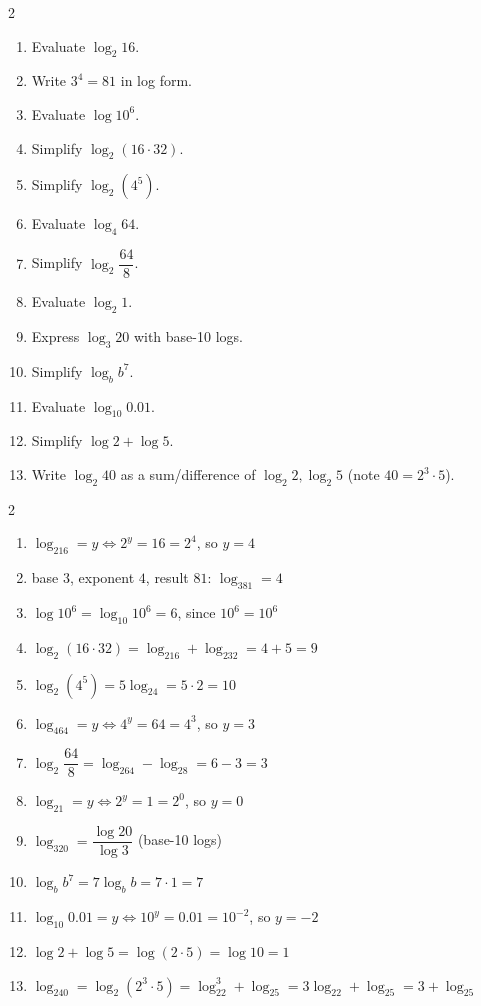 \documentclass[11pt]{article}
\begin{document}
\begin{recapbox}
\begin{multicols}{2}
\small
\begin{enumerate}[leftmargin=*,itemsep=3pt]
  \item Evaluate $\log_2 16$.
  \item Write $3^4=81$ in log form.
  \item Evaluate $\log 10^6$.
  \item Simplify $\log_2(16\cdot32)$.
  \item Simplify $\log_2(4^5)$.
  \item Evaluate $\log_4 64$.
  \item Simplify $\log_2\dfrac{64}{8}$.
  \item Evaluate $\log_2 1$.
  \item Express $\log_3 20$ with base-10 logs.
  \item Simplify $\log_b b^7$.
  \item Evaluate $\log_{10} 0.01$.
  \item Simplify $\log 2+\log 5$.
  \item Write $\log_2 40$ as a sum/difference of $\log_2 2,\log_2 5$ (note $40=2^3\cdot5$).
\end{enumerate}
\end{multicols}
\end{recapbox}

\begin{keybox}
\begin{multicols}{2}
\small
\begin{enumerate}[leftmargin=*,itemsep=3pt]
  \item $\log_216=y\iff2^y=16=2^4$, so $y=4$
  \item base $3$, exponent $4$, result $81$: $\log_381=4$
  \item $\log10^6=\log_{10}10^6=6$, since $10^6=10^6$
  \item $\log_2(16\cdot32)=\log_216+\log_232=4+5=9$
  \item $\log_2(4^5)=5\log_24=5\cdot2=10$
  \item $\log_464=y\iff4^y=64=4^3$, so $y=3$
  \item $\log_2\dfrac{64}{8}=\log_264-\log_28=6-3=3$
  \item $\log_21=y\iff2^y=1=2^0$, so $y=0$
  \item $\log_320=\dfrac{\log20}{\log3}$ (base-10 logs)
  \item $\log_bb^7=7\log_bb=7\cdot1=7$
  \item $\log_{10}0.01=y\iff10^y=0.01=10^{-2}$, so $y=-2$
  \item $\log2+\log5=\log(2\cdot5)=\log10=1$
  \item $\log_240=\log_2(2^3\cdot5)=\log_22^3+\log_25=3\log_22+\log_25=3+\log_25$
\end{enumerate}
\end{multicols}
\end{keybox}
\end{document}
